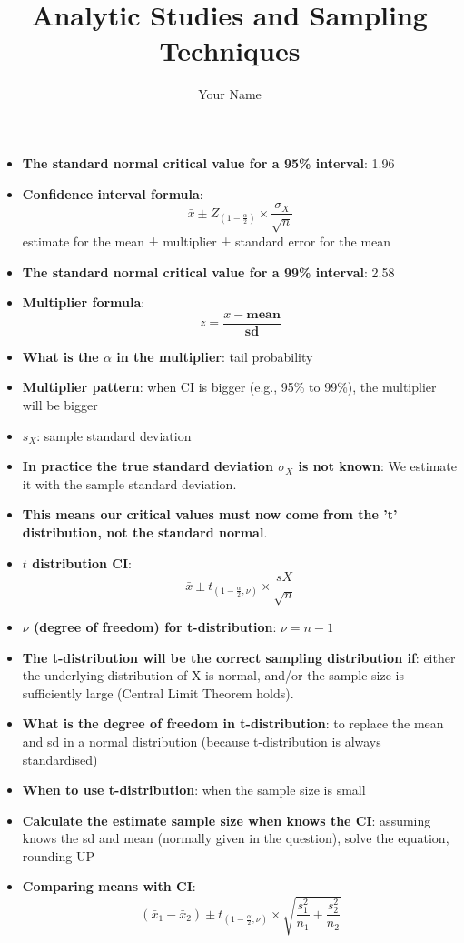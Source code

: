 \documentclass[12pt]{article}
\author{Your Name}
\title{Analytic Studies and Sampling Techniques}
\date{}
\begin{document}
\pagestyle{fancy}

\begin{itemize}
\item \textbf{The standard normal critical value for a 95\% interval}: 1.96
\item \textbf{Confidence interval formula}: $$\bar{x} \pm Z_{(1-\frac{\alpha}{2})} \times \frac{\sigma_X}{\sqrt{n}}$$
estimate for the mean ± multiplier ± standard error for the mean
\item \textbf{The standard normal critical value for a 99\% interval}: 2.58
\item \textbf{Multiplier formula}: $$z = \frac{x - \textbf{mean}}{\textbf{sd}}$$
\item \textbf{What is the $\alpha$ in the multiplier}: tail probability
\item \textbf{Multiplier pattern}: when CI is bigger (e.g., 95\% to 99\%), the multiplier will be bigger
\item \textbf{$s_X$}: sample standard deviation
\item \textbf{In practice the true standard deviation $\sigma_X$ is not known}: We estimate it with the sample standard deviation.
\item \textbf{This means our critical values must now come from the 't' distribution, not the standard normal}.
\item \textbf{$t$ distribution CI}: $$\bar{x} \pm t_{(1-\frac{\alpha}{2}, \nu)} \times \frac{sX}{\sqrt{n}}$$
\item \textbf{$\nu$ (degree of freedom) for t-distribution}: $\nu = n - 1$
\item \textbf{The t-distribution will be the correct sampling distribution if}: either the underlying distribution of X is normal, and/or the sample size is sufficiently large (Central Limit Theorem holds).
\item \textbf{What is the degree of freedom in t-distribution}: to replace the mean and sd in a normal distribution (because t-distribution is always standardised)
\item \textbf{When to use t-distribution}: when the sample size is small
\item \textbf{Calculate the estimate sample size when knows the CI}: assuming knows the sd and mean (normally given in the question), solve the equation, rounding UP
\item \textbf{Comparing means with CI}: $$(\bar{x}_1 - \bar{x}_2) \pm t_{(1-\frac{\alpha}{2}, \nu)} \times \sqrt{\frac{s_1^2}{n_1} + \frac{s_2^2}{n_2}}$$

\end{itemize}
\end{document}
